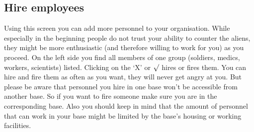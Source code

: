 \subsection{Hire employees}
Using this screen you can add more personnel to your organisation. While especially in the beginning people do not trust your ability to counter the aliens, they might be more enthusiastic (and therefore willing to work for you) as you proceed. On the left side you find all members of one group (soldiers, medics, workers, scientists) listed. Clicking on the `X' or $\surd$ hires or fires them. You can hire and fire  them as often as you want, they will never get angry at you. But please be aware that personnel you hire in one base won't be accessible from another base. So if you want to fire someone make sure you are in the corresponding base. Also you should keep in mind that the amount of personnel that can work in your base might be limited by the base's housing or working facilities.
